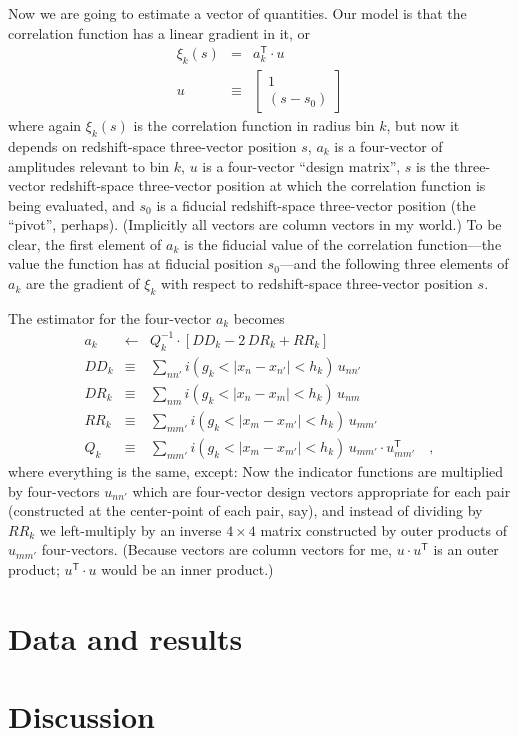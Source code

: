 \documentclass[12pt, letterpaper]{article}
\newcommand{\inv}{^{-1}}
\newcommand{\T}{^{\mathsf{T}}}
\begin{document}
Now we are going to estimate a vector of quantities.
Our model is that the correlation function has a linear gradient in it, or
\begin{eqnarray}\displaystyle
\xi_k(s) &=& a_k\T\cdot u
\\
u &\equiv& \left[\begin{array}{c}1 \\ (s - s_0)\end{array}\right]
\end{eqnarray}
where
again $\xi_k(s)$ is the correlation function in radius bin $k$,
but now it depends on redshift-space three-vector position $s$,
$a_k$ is a four-vector of amplitudes relevant to bin $k$,
$u$ is a four-vector ``design matrix'',
$s$ is the three-vector redshift-space three-vector position
at which the correlation function is being evaluated,
and
$s_0$ is a fiducial redshift-space three-vector position (the ``pivot'', perhaps).
(Implicitly all vectors are column vectors in my world.)
To be clear, the first element of $a_k$ is the fiducial value of the correlation
function---the value the function has at fiducial position $s_0$---and the
following three elements of $a_k$ are the gradient of $\xi_k$ with respect to
redshift-space three-vector position $s$.

The estimator for the four-vector $a_k$ becomes
\begin{eqnarray}\displaystyle
a_k &\leftarrow& Q_k\inv\cdot [DD_k - 2\,DR_k + RR_k]
\\
DD_k &\equiv& \sum_{n n'} i(g_k < |x_n - x_{n'}| < h_k)\,u_{n n'}
\\
DR_k &\equiv& \sum_{n m} i(g_k < |x_n - x_m| < h_k)\,u_{n m}
\\
RR_k &\equiv& \sum_{m m'} i(g_k < |x_m - x_{m'}| < h_k)\,u_{m m'}
\\
Q_k &\equiv& \sum_{m m'} i(g_k < |x_m - x_{m'}| < h_k)\,u_{m m'} \cdot u_{m m'}\T
\quad ,
\end{eqnarray}
where
everything is the same, except:
Now the indicator functions are multiplied by four-vectors $u_{n n'}$ which are
four-vector design vectors appropriate for each pair (constructed at the center-point
of each pair, say),
and
instead of dividing by $RR_k$ we left-multiply by an inverse $4\times 4$ matrix
constructed by outer products of $u_{m m'}$ four-vectors.
(Because vectors are column vectors for me, $u\cdot u\T$ is an outer product;
$u\T\cdot u$ would be an inner product.)

\section{Data and results}

\section{Discussion}
\end{document}
